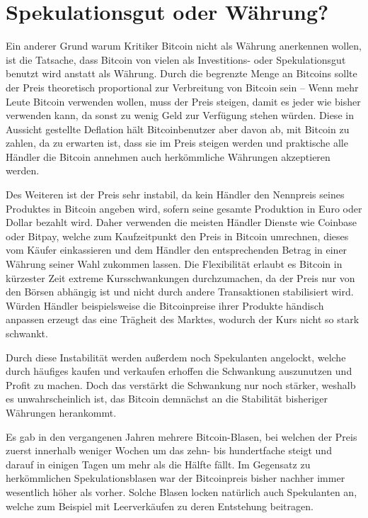 \section{Spekulationsgut oder Währung?}
\label{sec:speculation}

Ein anderer Grund warum Kritiker Bitcoin nicht als Währung anerkennen wollen, ist die Tatsache, dass Bitcoin von vielen als Investitions- oder Spekulationsgut benutzt wird anstatt als Währung.
Durch die begrenzte Menge an Bitcoins sollte der Preis theoretisch proportional zur Verbreitung von Bitcoin sein -- Wenn mehr Leute Bitcoin verwenden wollen, muss der Preis steigen, damit es jeder wie bisher verwenden kann, da sonst zu wenig Geld zur Verfügung stehen würden.
Diese in Aussicht gestellte Deflation hält Bitcoinbenutzer aber davon ab, mit Bitcoin zu zahlen, da zu erwarten ist, dass sie im Preis steigen werden und praktische alle Händler die Bitcoin annehmen auch herkömmliche Währungen akzeptieren werden.

Des Weiteren ist der Preis sehr instabil, da kein Händler den Nennpreis seines Produktes in Bitcoin angeben wird, sofern seine gesamte Produktion in Euro oder Dollar bezahlt wird.
Daher verwenden die meisten Händler Dienste wie Coinbase oder Bitpay, welche zum Kaufzeitpunkt den Preis in Bitcoin umrechnen, dieses vom Käufer einkassieren und dem Händler den entsprechenden Betrag in einer Währung seiner Wahl zukommen lassen.
Die Flexibilität erlaubt es Bitcoin in kürzester Zeit extreme Kursschwankungen durchzumachen, da der Preis nur von den Börsen abhängig ist und nicht durch andere Transaktionen stabilisiert wird.
Würden Händler beispielsweise die Bitcoinpreise ihrer Produkte händisch anpassen erzeugt das eine Trägheit des Marktes, wodurch der Kurs nicht so stark schwankt.

Durch diese Instabilität werden außerdem noch Spekulanten angelockt, welche durch häufiges kaufen und verkaufen erhoffen die Schwankung auszunutzen und Profit zu machen.
Doch das verstärkt die Schwankung nur noch stärker, weshalb es unwahrscheinlich ist, das Bitcoin demnächst an die Stabilität bisheriger Währungen herankommt.

Es gab in den vergangenen Jahren mehrere Bitcoin-Blasen, bei welchen der Preis zuerst innerhalb weniger Wochen um das zehn- bis hundertfache steigt und darauf in einigen Tagen um mehr als die Hälfte fällt.
Im Gegensatz zu herkömmlichen Spekulationsblasen war der Bitcoinpreis bisher nachher immer wesentlich höher als vorher.
Solche Blasen locken natürlich auch Spekulanten an, welche zum Beispiel mit Leerverkäufen zu deren Entstehung beitragen.
